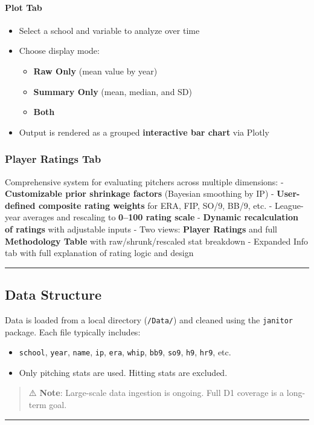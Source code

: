 \documentclass[
]{article}
\providecommand{\tightlist}{%
  \setlength{\itemsep}{0pt}\setlength{\parskip}{0pt}}
\begin{document}
\paragraph{Plot Tab}\label{plot-tab}

\begin{itemize}
\tightlist
\item
  Select a school and variable to analyze over time
\item
  Choose display mode:

  \begin{itemize}
  \tightlist
  \item
    \textbf{Raw Only} (mean value by year)
  \item
    \textbf{Summary Only} (mean, median, and SD)
  \item
    \textbf{Both}
  \end{itemize}
\item
  Output is rendered as a grouped \textbf{interactive bar chart} via
  Plotly
\end{itemize}

\subsubsection{Player Ratings Tab}\label{player-ratings-tab}

Comprehensive system for evaluating pitchers across multiple dimensions:
- \textbf{Customizable prior shrinkage factors} (Bayesian smoothing by
IP) - \textbf{User-defined composite rating weights} for ERA, FIP, SO/9,
BB/9, etc. - League-year averages and rescaling to \textbf{0--100 rating
scale} - \textbf{Dynamic recalculation of ratings} with adjustable
inputs - Two views: \textbf{Player Ratings} and full \textbf{Methodology
Table} with raw/shrunk/rescaled stat breakdown - Expanded Info tab with
full explanation of rating logic and design

\begin{center}\rule{0.5\linewidth}{0.5pt}\end{center}

\subsection{Data Structure}\label{data-structure}

Data is loaded from a local directory (\texttt{/Data/}) and cleaned
using the \texttt{janitor} package. Each file typically includes:

\begin{itemize}
\tightlist
\item
  \texttt{school}, \texttt{year}, \texttt{name}, \texttt{ip},
  \texttt{era}, \texttt{whip}, \texttt{bb9}, \texttt{so9}, \texttt{h9},
  \texttt{hr9}, etc.
\item
  Only pitching stats are used. Hitting stats are excluded.
\end{itemize}

\begin{quote}
⚠️ \textbf{Note}: Large-scale data ingestion is ongoing. Full D1
coverage is a long-term goal.
\end{quote}

\begin{center}\rule{0.5\linewidth}{0.5pt}\end{center}
\end{document}
